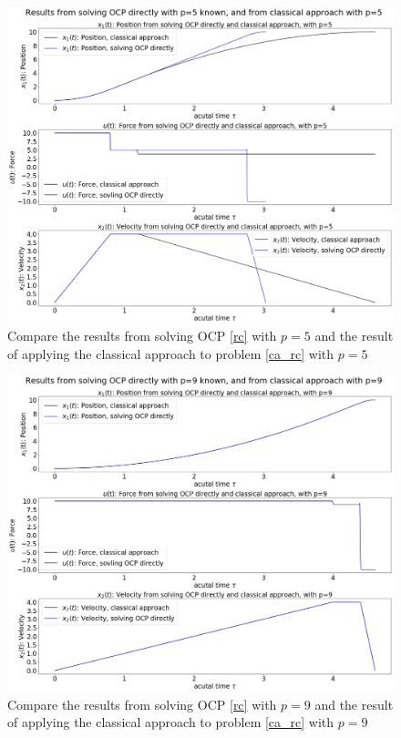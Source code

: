 \documentclass  [
  paper    = a4,
  BCOR     = 10mm,
  twoside,
  fontsize = 12pt,
  fleqn,
  toc      = bibnumbered,
  toc      = listofnumbered,
  numbers  = noendperiod,
  headings = normal,
  listof   = leveldown,
  version  = 3.03
]                                       {scrreprt}
\newcommand{\<}{\langle}
\renewcommand{\>}{\rangle}
\begin{document}
\begin{figure}[H]
	\centerline{\includegraphics[width=12.5cm]{ca_compare_p5.png}}
	\caption{Compare the results from solving OCP \ref{rc} with $p=5$ and the result of applying the classical approach to problem \ref{ca_rc} with $p=5$}
	\label{fig_ca_compare_p5}
\end{figure}

\begin{figure}[H]
	\centerline{\includegraphics[width=12.5cm]{ca_compare_p9_old.png}}
	\caption{Compare the results from solving OCP \ref{rc} with $p=9$ and the result of applying the classical approach to problem \ref{ca_rc} with $p=9$}
	\label{fig_ca_compare_p9}
\end{figure}
\end{document}
